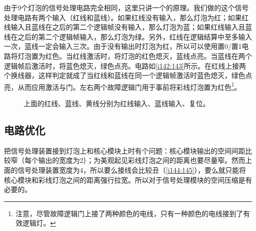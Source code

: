 由于9个灯泡的信号处理电路完全相同，这里只讲一个的原理。我们做的这个信号处理电路有两个输入（红线和蓝线）。如果红线没有输入，那么灯泡为红；如果红线输入且蓝线在之后的第二个逻辑帧没有输入，那么灯泡为蓝；如果红线输入且蓝线在之后的第二个逻辑帧输入，那么灯泡为绿。另外，红线在逻辑结算中至多输入一次，蓝线一定会输入三次。由于没有输出时灯泡为红，所以可以使用置0/置1电路将灯泡置为红色。当红线激活时，将灯泡的红色熄灭，蓝线点亮。当蓝线在两个逻辑帧后激活时，将蓝色熄灭，绿色点亮。电路如\autoref{i142:143}所示。在红线上接两个换线器，这样判定就成了当红线和蓝线在同一个逻辑帧激活时蓝色熄灭，绿色点亮，从而应用激活与门。左右两个故障逻辑门用于事前将彩线灯泡置为红色\footnote{注意，尽管故障逻辑门上接了两种颜色的电线，只有一种颜色的电线接到了有效逻辑灯。}。

\begin{figure}[!ht]
\begin{center}
\qquad
{}
\end{center}
\caption{上面的红线、蓝线、黄线分别为红线输入、蓝线输入、复位。}
\label{i142:143}
\end{figure}

\subsection{电路优化}

把信号处理装置接到灯泡上和核心模块上时有个问题：核心模块输出的空间间距比较窄（每个输出的宽度为2）；为美观起见彩线灯泡之间的距离也要尽量窄。然而上面的信号处理装置宽度为4，所以要么接线会比较丑（\autoref{i144:145}），要么就只能将核心模块和彩线灯泡之间的距离强行拉宽。所以对于信号处理模块的空间压缩是有必要的。

